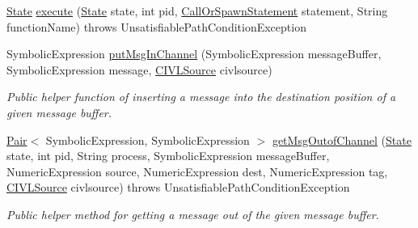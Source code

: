 \begin{DoxyCompactItemize}
\item 
\hyperlink{interfaceedu_1_1udel_1_1cis_1_1vsl_1_1civl_1_1state_1_1IF_1_1State}{State} \hyperlink{classedu_1_1udel_1_1cis_1_1vsl_1_1civl_1_1library_1_1comm_1_1LibcommExecutor_a63cdf3422becd2d35181bc01408f7f2a}{execute} (\hyperlink{interfaceedu_1_1udel_1_1cis_1_1vsl_1_1civl_1_1state_1_1IF_1_1State}{State} state, int pid, \hyperlink{interfaceedu_1_1udel_1_1cis_1_1vsl_1_1civl_1_1model_1_1IF_1_1statement_1_1CallOrSpawnStatement}{Call\+Or\+Spawn\+Statement} statement, String function\+Name)  throws Unsatisfiable\+Path\+Condition\+Exception 
\item 
Symbolic\+Expression \hyperlink{classedu_1_1udel_1_1cis_1_1vsl_1_1civl_1_1library_1_1comm_1_1LibcommExecutor_a9c720393a3eb31afee54741252835e66}{put\+Msg\+In\+Channel} (Symbolic\+Expression message\+Buffer, Symbolic\+Expression message, \hyperlink{interfaceedu_1_1udel_1_1cis_1_1vsl_1_1civl_1_1model_1_1IF_1_1CIVLSource}{C\+I\+V\+L\+Source} civlsource)
\begin{DoxyCompactList}\small\item\em Public helper function of inserting a message into the destination position of a given message buffer. \end{DoxyCompactList}\item 
\hyperlink{classedu_1_1udel_1_1cis_1_1vsl_1_1civl_1_1util_1_1IF_1_1Pair}{Pair}$<$ Symbolic\+Expression, Symbolic\+Expression $>$ \hyperlink{classedu_1_1udel_1_1cis_1_1vsl_1_1civl_1_1library_1_1comm_1_1LibcommExecutor_a236aeaba1497f4549c850f4e8ab86022}{get\+Msg\+Outof\+Channel} (\hyperlink{interfaceedu_1_1udel_1_1cis_1_1vsl_1_1civl_1_1state_1_1IF_1_1State}{State} state, int pid, String process, Symbolic\+Expression message\+Buffer, Numeric\+Expression source, Numeric\+Expression dest, Numeric\+Expression tag, \hyperlink{interfaceedu_1_1udel_1_1cis_1_1vsl_1_1civl_1_1model_1_1IF_1_1CIVLSource}{C\+I\+V\+L\+Source} civlsource)  throws Unsatisfiable\+Path\+Condition\+Exception 
\begin{DoxyCompactList}\small\item\em Public helper method for getting a message out of the given message buffer. \end{DoxyCompactList}\end{DoxyCompactItemize}
